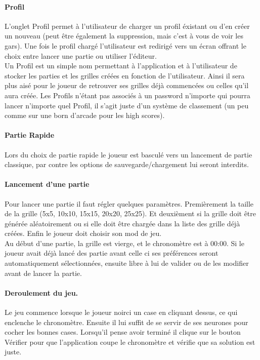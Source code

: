 \documentclass[11pt]{article}
\begin{document}
\paragraph{Profil}
L'onglet Profil permet à l'utilisateur de charger un profil éxistant ou d'en créer un nouveau (peut être également la
suppression, mais c'est à vous de voir les gars). Une fois le profil chargé l'utilisateur est redirigé vers un écran
offrant le choix entre lancer une partie ou utiliser l'éditeur.\\
Un Profil est un simple nom permettant à l'application et à l'utilisateur de stocker les parties et les grilles créées
en fonction de l'utilisateur. Ainsi il sera plus aisé pour le joueur de retrouver ses grilles déjà commencées ou celles
qu'il aura créée. Les Profils n'étant pas associés à un password n'importe qui pourra lancer n'importe quel Profil, il
s'agit juste d'un système de classement (un peu comme sur une born d'arcade pour les high scores).

\paragraph{Partie Rapide}
Lors du choix de partie rapide le joueur est basculé vers un lancement de partie classique, par contre les options de
sauvegarde/chargement lui seront interdits.

\paragraph{Lancement d'une partie}
Pour lancer une partie il faut régler quelques paramètres. Premièrement la taille de la grille (5x5, 10x10, 15x15,
20x20, 25x25). Et deuxièment si la grille doit être générée aléatoirement ou si elle doit être chargée dans la liste des
grille déjà créées. Enfin le joueur doit choisir son mod de jeu.\\
Au début d'une partie, la grille est vierge, et le chronomètre est à 00:00.
Si le joueur avait déjà lancé des partie avant celle ci ses préférences seront automatiquement sélectionnées, ensuite
libre à lui de valider ou de les modifier avant de lancer la partie.

\paragraph{Deroulement du jeu.}

Le jeu commence lorsque le joueur noirci un case en cliquant dessus, ce qui enclenche le chronomètre. Ensuite il lui
suffit de se servir de ses neurones pour cocher les bonnes cases. Lorsqu'il pense avoir terminé il clique sur le bouton
Vérifier pour que l'application coupe le chronomètre et vérifie que sa solution est juste.
\end{document}
